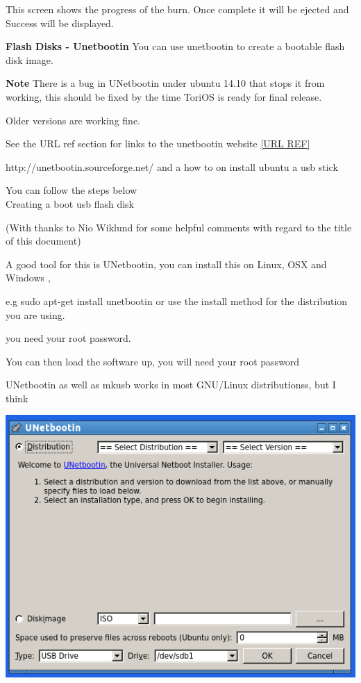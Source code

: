 \documentclass[12pt,a4paper]{book}
\begin{document}
This screen shows the progress of the burn.  Once complete it will be ejected and Success will be displayed. 

\newpage

\textbf{Flash Disks - Unetbootin}
You can use unetbootin to create a bootable flash disk image.   

\textbf{Note} There is a bug in UNetbootin under ubuntu 14.10 that stops it from working,  this should be fixed by the time ToriOS is ready for final release. 

Older versions are working fine.

See the URL ref section for links to the unetbootin website \ref{URL REF}

http://unetbootin.sourceforge.net/ \cite{unetbootin} and a how to on install ubuntu a usb stick \cite{unetbootin2}

You can follow the steps below \\

Creating a boot usb flash disk

(With thanks to Nio Wiklund for some helpful comments with regard to the title of this document)

A good tool for this is UNetbootin, \cite{unetbootin}  you can install this on Linux, OSX and Windows ,

e.g sudo apt-get install unetbootin or use the install method for the distribution you are using. 

you need your root password.

You can then load the software up, you will need your root password

UNetbootin as well as mkusb works in most GNU/Linux distributionss, but I think

\newpage




\begin{center}
\includegraphics[width=0.7\linewidth]{unetbootin} 
\end{center}
\end{document}
